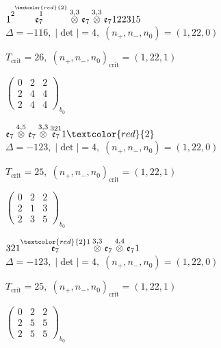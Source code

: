 \documentclass[10pt]{article}
\begin{document}
\smallskip

$1\overset{2\overset{\textcolor{red}{2}}{1}}{\mathfrak{e}_7}\overset{3,3}{\otimes}\mathfrak{e}_7\overset{3,3}{\otimes}\mathfrak{e}_7122315$ \quad $\Delta=-116,\; |\det|=4,\; (n_+,n_-,n_0)=(1,22,0)$

\hspace{1em}$T_{\text{crit}}=26,\; (n_+,n_-,n_0)_{\text{crit}}=(1,22,1)$

\hspace{2em}$\left(\begin{smallmatrix}0 & 2 & 2 \\ 2 & 4 & 4 \\ 2 & 4 & 4\end{smallmatrix}\right)_{\!b_0}$

\smallskip

$\mathfrak{e}_7\overset{4,5}{\otimes}\mathfrak{e}_7\overset{3,3}{\otimes}\overset{321}{\mathfrak{e}_7}1\textcolor{red}{2}$ \quad $\Delta=-123,\; |\det|=4,\; (n_+,n_-,n_0)=(1,22,0)$

\hspace{1em}$T_{\text{crit}}=25,\; (n_+,n_-,n_0)_{\text{crit}}=(1,22,1)$

\hspace{2em}$\left(\begin{smallmatrix}0 & 2 & 2 \\ 2 & 1 & 3 \\ 2 & 3 & 5\end{smallmatrix}\right)_{\!b_0}$

\smallskip

$321\overset{\textcolor{red}{2}1}{\mathfrak{e}_7}\overset{3,3}{\otimes}\mathfrak{e}_7\overset{4,4}{\otimes}\mathfrak{e}_71$ \quad $\Delta=-123,\; |\det|=4,\; (n_+,n_-,n_0)=(1,22,0)$

\hspace{1em}$T_{\text{crit}}=25,\; (n_+,n_-,n_0)_{\text{crit}}=(1,22,1)$

\hspace{2em}$\left(\begin{smallmatrix}0 & 2 & 2 \\ 2 & 5 & 5 \\ 2 & 5 & 5\end{smallmatrix}\right)_{\!b_0}$
\end{document}
